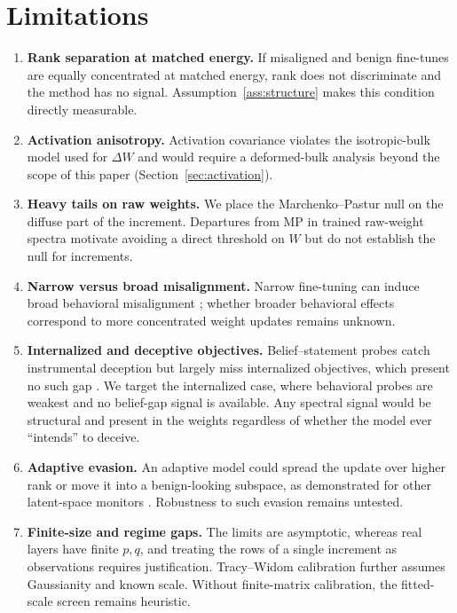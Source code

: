 \documentclass[11pt]{article}
\theoremstyle{definition}
\theoremstyle{remark}
\newcommand{\dW}{\Delta W}
\begin{document}
\section{Limitations}
\label{sec:limits}

\begin{enumerate}[leftmargin=1.6em,itemsep=3pt]
\item \textbf{Rank separation at matched energy.} If
misaligned and benign fine-tunes are equally concentrated at matched energy, rank does not
discriminate and the method has no signal. Assumption~\ref{ass:structure} makes this
condition directly measurable.
\item \textbf{Activation anisotropy.} Activation covariance violates the
isotropic-bulk model used for $\dW$ and would require a deformed-bulk analysis
beyond the scope of this paper (Section~\ref{sec:activation}).
\item \textbf{Heavy tails on raw weights.} We place the Marchenko--Pastur null on the
diffuse part of the increment. Departures from MP in trained raw-weight spectra
\cite{martin2021} motivate avoiding a direct threshold on $W$ but do not establish the null
for increments.
\item \textbf{Narrow versus broad misalignment.} Narrow fine-tuning can induce
broad behavioral misalignment \cite{betley2025}; whether broader behavioral
effects correspond to more concentrated weight updates remains unknown.
\item \textbf{Internalized and deceptive objectives.} Belief--statement probes catch
instrumental deception but largely miss internalized objectives, which present no such gap
\cite{fanatics2026}. We target the internalized case, where behavioral probes are weakest
and no belief-gap signal is available. Any spectral signal would be structural and present
in the weights regardless of whether the model ever ``intends'' to deceive.
\item \textbf{Adaptive evasion.} An adaptive model could spread the update over
higher rank or move it into a benign-looking subspace, as demonstrated for other
latent-space monitors \cite{bailey2024}. Robustness to such evasion remains
untested.
\item \textbf{Finite-size and regime gaps.} The limits are asymptotic, whereas
real layers have finite $p,q$, and treating the rows of a single increment as
observations requires justification. Tracy--Widom calibration further assumes
Gaussianity and known scale. Without finite-matrix calibration, the fitted-scale
screen remains heuristic.

\end{enumerate}
\end{document}
